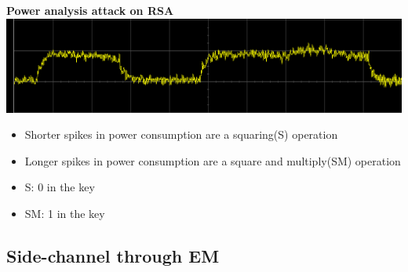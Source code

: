 \documentclass{beamer}
\begin{document}
		\begin{frame}
			\textbf{Power analysis attack on RSA}
		  \includegraphics[width= \textwidth]{Images/Power_attack.png} 
		  \begin{itemize}
		  \item Shorter spikes in power consumption are a squaring(S) operation
		  \item Longer spikes in power consumption are a square and multiply(SM) operation
		  \item S: 0 in the key
		  \item SM: 1 in the key
		  \end{itemize}
		\end{frame}
	\subsection{Side-channel through EM}
		
\end{document}
